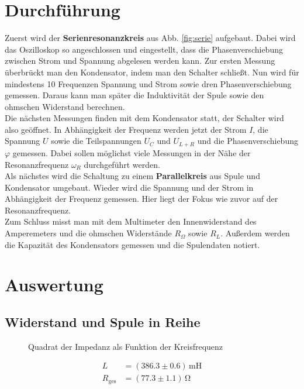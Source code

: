 \documentclass[12pt,a4paper,titlepage,headinclude,bibtotoc]{scrartcl}
\begin{document}
\section{Durchführung}
\label{sec:durchfuehrung}

Zuerst wird der \textbf{Serienresonanzkreis} aus Abb. \eqref{fig:serie} aufgebaut.
Dabei wird das Oszilloskop so angeschlossen und eingestellt, dass die Phasenverschiebung zwischen Strom und Spannung abgelesen werden kann.
Zur ersten Messung überbrückt man den Kondensator, indem man den Schalter schließt.
Nun wird für mindestens 10 Frequenzen Spannung und Strom sowie dren Phasenverschiebung gemessen.
Daraus kann man später die Induktivität der Spule sowie den ohmschen Widerstand berechnen.\\
Die nächsten Messungen finden mit dem Kondensator statt, der Schalter wird also geöffnet.
In Abhängigkeit der Frequenz werden jetzt der Strom $I$, die Spannung $U$ sowie die Teilspannungen $U_C$ und $U_{L+R}$ und die Phasenverschiebung $\varphi$ gemessen.
Dabei sollen möglichst viele Messungen in der Nähe der Resonanzfrequenz $\omega_R$ durchgeführt werden.\\
Als nächstes wird die Schaltung zu einem \textbf{Parallelkreis} aus Spule und Kondensator umgebaut.
Wieder wird die Spannung und der Strom in Abhängigkeit der Frequenz gemessen.
Hier liegt der Fokus wie zuvor auf der Resonanzfrequenz.\\

Zum Schluss misst man mit dem Multimeter den Innenwiderstand des Amperemeters und die ohmschen Widerstände $R_\Omega$ sowie $R_L$.
Außerdem werden die Kapazität des Kondensators gemessen und die Spulendaten notiert. 

\section{Auswertung}
\label{sec:auswertung}
\subsection{Widerstand und Spule in Reihe}
\begin{figure}[!htb]
	\centering
	
	\caption{Quadrat der Impedanz als Funktion der Kreisfrequenz}
	\label{fig:messung1}
\end{figure}

\begin{align}
	L&=(386.3\pm 0.6)\,\si{\milli\henry}\\
	R_\text{ges}&=(77.3 \pm 1.1)\,\si{\ohm}
\end{align}
\end{document}
